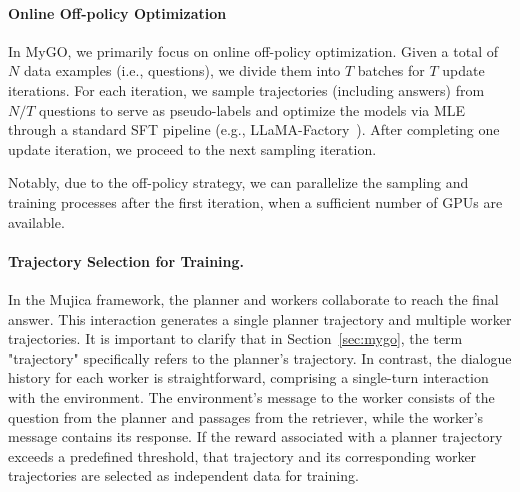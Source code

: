 \paragraph{Online Off-policy Optimization}

In MyGO, we primarily focus on online off-policy optimization. 
Given a total of $N$ data examples (i.e., questions), we divide them into $T$ batches for $T$ update iterations.
For each iteration, we sample trajectories (including answers) from $N/T$ questions to serve as pseudo-labels and optimize the models via MLE through a standard SFT pipeline (e.g., LLaMA-Factory~\cite{zheng2024llamafactory}).
After completing one update iteration, we proceed to the next sampling iteration.

Notably, due to the off-policy strategy, 
we can parallelize the sampling and training processes after the first iteration, when a sufficient number of GPUs are available.



\paragraph{Trajectory Selection for Training.}
In the Mujica framework, the planner and workers collaborate to reach the final answer. This interaction generates a single planner trajectory and multiple worker trajectories. It is important to clarify that in Section~\ref{sec:mygo}, the term "trajectory" specifically refers to the planner's trajectory. In contrast, the dialogue history for each worker is straightforward, comprising a single-turn interaction with the environment. The environment's message to the worker consists of the question from the planner and passages from the retriever, while the worker's message contains its response. If the reward associated with a planner trajectory exceeds a predefined threshold, that trajectory and its corresponding worker trajectories are selected as independent data for training.


